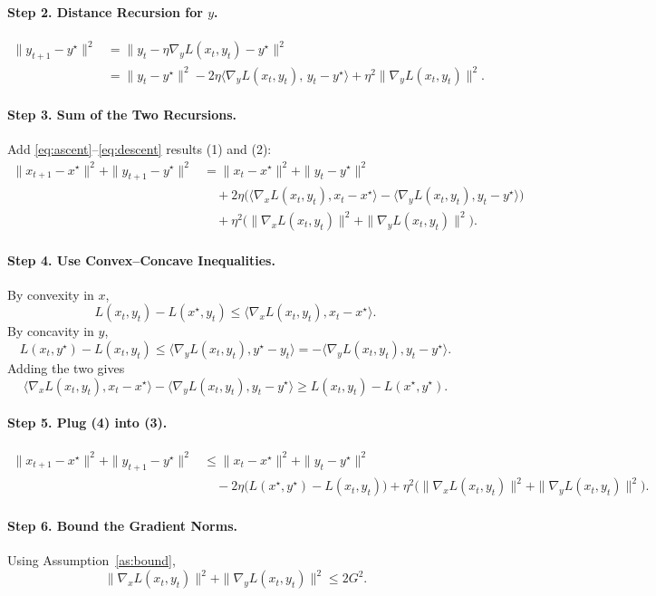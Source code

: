 \documentclass{article}
\begin{document}
\paragraph{Step 2. Distance Recursion for $y$.}
\begin{align}
\|y_{t+1}-y^\star\|^2
&= \|y_t-\eta\nabla_y L(x_t,y_t)-y^\star\|^2 \nonumber\\
&= \|y_t-y^\star\|^2 - 2\eta\langle\nabla_y L(x_t,y_t),\,y_t-y^\star\rangle
   +\eta^2\|\nabla_y L(x_t,y_t)\|^2. \tag{2}
\end{align}
\paragraph{Step 3. Sum of the Two Recursions.}
Add \eqref{eq:ascent}–\eqref{eq:descent} results (1) and (2):
\begin{align}
\|x_{t+1}-x^\star\|^2+\|y_{t+1}-y^\star\|^2
&= \|x_t-x^\star\|^2+\|y_t-y^\star\|^2 \nonumber\\
&\quad + 2\eta\Big(\langle\nabla_x L(x_t,y_t),x_t-x^\star\rangle
          -\langle\nabla_y L(x_t,y_t),y_t-y^\star\rangle\Big) \nonumber\\
&\quad +\eta^2\big(\|\nabla_x L(x_t,y_t)\|^2+\|\nabla_y L(x_t,y_t)\|^2\big). \tag{3}
\end{align}
\paragraph{Step 4. Use Convex–Concave Inequalities.}
By convexity in $x$,
\[
L(x_t,y_t)-L(x^\star,y_t)\le\langle\nabla_x L(x_t,y_t),x_t-x^\star\rangle.
\]
By concavity in $y$,
\[
L(x_t,y^\star)-L(x_t,y_t)\le\langle\nabla_y L(x_t,y_t),y^\star-y_t\rangle
      =-\langle\nabla_y L(x_t,y_t),y_t-y^\star\rangle.
\]
Adding the two gives
\[
\langle\nabla_x L(x_t,y_t),x_t-x^\star\rangle
-\langle\nabla_y L(x_t,y_t),y_t-y^\star\rangle
\ge L(x_t,y_t)-L(x^\star,y^\star). \tag{4}
\]
\paragraph{Step 5. Plug (4) into (3).}
\begin{align}
\|x_{t+1}-x^\star\|^2+\|y_{t+1}-y^\star\|^2
&\le \|x_t-x^\star\|^2+\|y_t-y^\star\|^2 \nonumber\\
&\quad -2\eta\big(L(x^\star,y^\star)-L(x_t,y_t)\big)
   +\eta^2\big(\|\nabla_x L(x_t,y_t)\|^2+\|\nabla_y L(x_t,y_t)\|^2\big). \tag{5}
\end{align}
\paragraph{Step 6. Bound the Gradient Norms.}
Using Assumption~\ref{as:bound},
\[
\|\nabla_x L(x_t,y_t)\|^2+\|\nabla_y L(x_t,y_t)\|^2\le 2G^2. \tag{6}
\]
\end{document}
